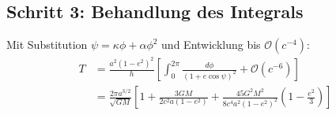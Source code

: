 \subsection*{Schritt 3: Behandlung des Integrals}
Mit Substitution \(\psi = \kappa\phi + \alpha\phi^2\) und Entwicklung bis \(\mathcal{O}(c^{-4})\):
\begin{align}
T &= \frac{a^2(1-e^2)^2}{h} \left[ \int_0^{2\pi} \frac{d\phi}{(1 + e\cos\psi)^2} + \mathcal{O}(c^{-6}) \right] \\
  &= \frac{2\pi a^{3/2}}{\sqrt{GM}} \left[1 + \frac{3GM}{2c^2a(1-e^2)} + \frac{45G^2M^2}{8c^4a^2(1-e^2)^2}\left(1 - \frac{e^2}{3}\right)\right]
\end{align}

